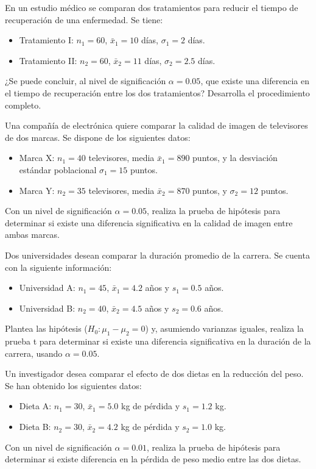 \documentclass[addpoints,12pt]{exam}
\theoremstyle{plain}
\theoremstyle{remark}
\theoremstyle{definition}
\begin{document}
\begin{questions}
 \question En un estudio médico se comparan dos tratamientos para reducir el tiempo de recuperación de una enfermedad. Se tiene:
    \begin{itemize}
        \item Tratamiento I: \( n_1 = 60 \), \( \bar{x}_1 = 10 \) días, \( \sigma_1 = 2 \) días.
        \item Tratamiento II: \( n_2 = 60 \), \( \bar{x}_2 = 11 \) días, \( \sigma_2 = 2.5 \) días.
    \end{itemize}
    ¿Se puede concluir, al nivel de significación \(\alpha = 0.05\), que existe una diferencia en el tiempo de recuperación entre los dos tratamientos? Desarrolla el procedimiento completo.

 \question Una compañía de electrónica quiere comparar la calidad de imagen de televisores de dos marcas. Se dispone de los siguientes datos:
    \begin{itemize}
        \item Marca X: \( n_1 = 40 \) televisores, media \( \bar{x}_1 = 890 \) puntos, y la desviación estándar poblacional \( \sigma_1 = 15 \) puntos.
        \item Marca Y: \( n_2 = 35 \) televisores, media \( \bar{x}_2 = 870 \) puntos, y \( \sigma_2 = 12 \) puntos.
    \end{itemize}
    Con un nivel de significación \(\alpha = 0.05\), realiza la prueba de hipótesis para determinar si existe una diferencia significativa en la calidad de imagen entre ambas marcas.

 \question Dos universidades desean comparar la duración promedio de la carrera. Se cuenta con la siguiente información:
    \begin{itemize}
        \item Universidad A: \( n_1 = 45 \), \( \bar{x}_1 = 4.2 \) años y \( s_1 = 0.5 \) años.
        \item Universidad B: \( n_2 = 40 \), \( \bar{x}_2 = 4.5 \) años y \( s_2 = 0.6 \) años.
    \end{itemize}
    Plantea las hipótesis (\(H_0: \mu_1 - \mu_2 = 0\)) y, asumiendo varianzas iguales, realiza la prueba t para determinar si existe una diferencia significativa en la duración de la carrera, usando \(\alpha = 0.05\).
    
 \question   Un investigador desea comparar el efecto de dos dietas en la reducción del peso. Se han obtenido los siguientes datos:
    \begin{itemize}
        \item Dieta A: \( n_1 = 30 \), \( \bar{x}_1 = 5.0 \) kg de pérdida y \( s_1 = 1.2 \) kg.
        \item Dieta B: \( n_2 = 30 \), \( \bar{x}_2 = 4.2 \) kg de pérdida y \( s_2 = 1.0 \) kg.
    \end{itemize}
    Con un nivel de significación \(\alpha = 0.01\), realiza la prueba de hipótesis para determinar si existe diferencia en la pérdida de peso medio entre las dos dietas.
    

\end{questions}
\end{document}
